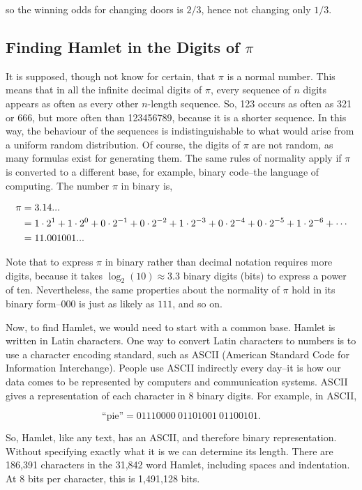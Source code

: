\documentclass[11pt]{amsart}
\begin{document}
so the winning odds for changing doors is $2/3$, hence not changing only $1/3$.

\subsection{Finding Hamlet in the Digits of $\pi$}

It is supposed, though not know for certain, that $\pi$ is a normal number. This means that in all the infinite decimal digits of $\pi$, every sequence of $n$ digits appears as often as every other $n$-length sequence. So, 123 occurs as often as 321 or 666, but more often than 123456789, because it is a shorter sequence. In this way, the behaviour of the sequences is indistinguishable to what would arise from a uniform random distribution. Of course, the digits of $\pi$ are not random, as many formulas exist for generating them. The same rules of normality apply if $\pi$ is converted to a different base, for example, binary code--the language of computing. The number $\pi$ in binary is,

\begin{align}
\pi &= 3.14... \notag \\
&= 1\cdot2^1 + 1\cdot2^0 + 0\cdot2^{-1} + 0\cdot2^{-2} + 1\cdot2^{-3} + 0\cdot2^{-4} + 0\cdot2^{-5} + 1\cdot2^{-6} + \cdots \notag \\
&= 11.001001... \notag
\end{align}

Note that to express $\pi$ in binary rather than decimal notation requires more digits, because it takes $\log_2(10) \approx 3.3$ binary digits (bits) to express a power of ten. Nevertheless, the same properties about the normality of $\pi$ hold in its binary form--$000$ is just as likely as $111$, and so on.

Now, to find Hamlet, we would need to start with a common base. Hamlet is written in Latin characters. One way to convert Latin characters to numbers is to use a character encoding standard, such as ASCII (American Standard Code for Information Interchange). People use ASCII indirectly every day--it is how our data comes to be represented by computers and communication systems. ASCII gives a representation of each character in 8 binary digits. For example, in ASCII,

$$\text{``pie''} = 01110000 \ 01101001 \ 01100101.$$

So, Hamlet, like any text, has an ASCII, and therefore binary representation. Without specifying exactly what it is we can determine its length. There are 186,391 characters in the 31,842 word Hamlet, including spaces and indentation. At 8 bits per character, this is 1,491,128 bits.
\end{document}
